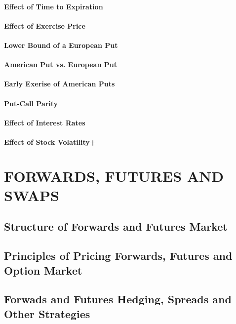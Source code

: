 \documentclass{book}
\theoremstyle{definition}
\theoremstyle{remark}
\begin{document}
        \subsubsection{Effect of Time to Expiration}
        \subsubsection{Effect of Exercise Price}
        \subsubsection{Lower Bound of a European Put}
        \subsubsection{American Put vs. European Put}
        \subsubsection{Early Exerise of American Puts}
        \subsubsection{Put-Call Parity}
        \subsubsection{Effect of Interest Rates}
        \subsubsection{Effect of Stock Volatility+}
        

\newpage
\chapter{FORWARDS, FUTURES AND SWAPS}
\section{Structure of Forwards and Futures Market}
\section{Principles of Pricing Forwards, Futures and Option Market}
\section{Forwads and Futures Hedging, Spreads and Other Strategies}
\end{document}
